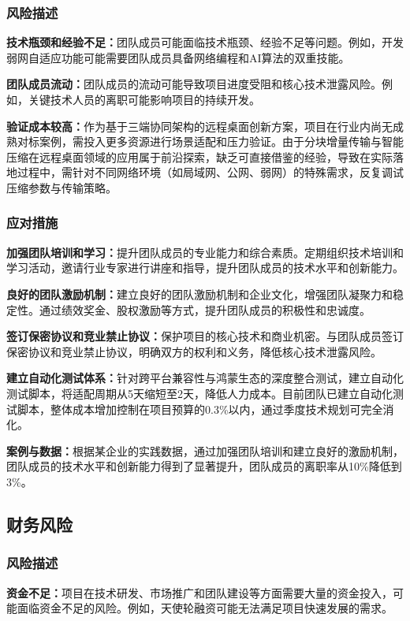 \documentclass[12pt,a4paper]{article}
\begin{document}
\subsubsection{风险描述}
\textbf{技术瓶颈和经验不足：}团队成员可能面临技术瓶颈、经验不足等问题。例如，开发弱网自适应功能可能需要团队成员具备网络编程和AI算法的双重技能。

\textbf{团队成员流动：}团队成员的流动可能导致项目进度受阻和核心技术泄露风险。例如，关键技术人员的离职可能影响项目的持续开发。

\textbf{验证成本较高：}作为基于三端协同架构的远程桌面创新方案，项目在行业内尚无成熟对标案例，需投入更多资源进行场景适配和压力验证。由于分块增量传输与智能压缩在远程桌面领域的应用属于前沿探索，缺乏可直接借鉴的经验，导致在实际落地过程中，需针对不同网络环境（如局域网、公网、弱网）的特殊需求，反复调试压缩参数与传输策略。

\subsubsection{应对措施}
\textbf{加强团队培训和学习：}提升团队成员的专业能力和综合素质。定期组织技术培训和学习活动，邀请行业专家进行讲座和指导，提升团队成员的技术水平和创新能力。

\textbf{良好的团队激励机制：}建立良好的团队激励机制和企业文化，增强团队凝聚力和稳定性。通过绩效奖金、股权激励等方式，提升团队成员的积极性和忠诚度。

\textbf{签订保密协议和竞业禁止协议：}保护项目的核心技术和商业机密。与团队成员签订保密协议和竞业禁止协议，明确双方的权利和义务，降低核心技术泄露风险。

\textbf{建立自动化测试体系：}针对跨平台兼容性与鸿蒙生态的深度整合测试，建立自动化测试脚本，将适配周期从5天缩短至2天，降低人力成本。目前团队已建立自动化测试脚本，整体成本增加控制在项目预算的0.3\%以内，通过季度技术规划可完全消化。

\textbf{案例与数据：}根据某企业的实践数据，通过加强团队培训和建立良好的激励机制，团队成员的技术水平和创新能力得到了显著提升，团队成员的离职率从10\%降低到3\%。

\subsection{财务风险}

\subsubsection{风险描述}
\textbf{资金不足：}项目在技术研发、市场推广和团队建设等方面需要大量的资金投入，可能面临资金不足的风险。例如，天使轮融资可能无法满足项目快速发展的需求。
\end{document}
